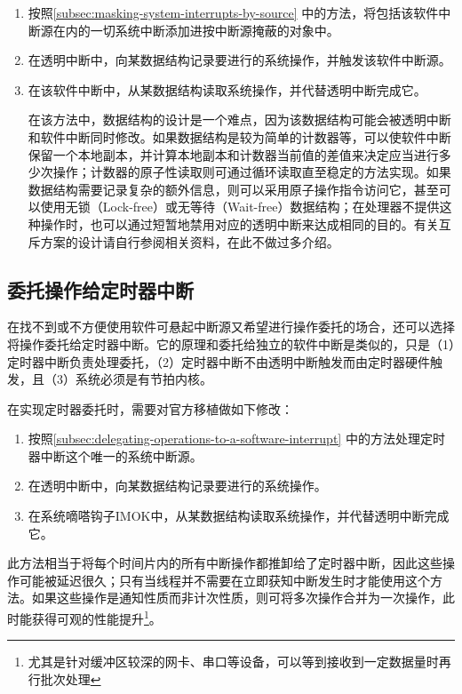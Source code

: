\begin{enumerate}
\def\labelenumi{\arabic{enumi}.}
\item
  按照\ref{subsec:masking-system-interrupts-by-source}
  中的方法，将包括该软件中断源在内的一切系统中断添加进按中断源掩蔽的对象中。
\item
  在透明中断中，向某数据结构记录要进行的系统操作，并触发该软件中断源。
\item
  在该软件中断中，从某数据结构读取系统操作，并代替透明中断完成它。

  在该方法中，数据结构的设计是一个难点，因为该数据结构可能会被透明中断和软件中断同时修改。如果数据结构是较为简单的计数器等，可以使软件中断保留一个本地副本，并计算本地副本和计数器当前值的差值来决定应当进行多少次操作；计数器的原子性读取则可通过循环读取直至稳定的方法实现。如果数据结构需要记录复杂的额外信息，则可以采用原子操作指令访问它，甚至可以使用无锁（Lock-free）或无等待（Wait-free）数据结构；在处理器不提供这种操作时，也可以通过短暂地禁用对应的透明中断来达成相同的目的。有关互斥方案的设计请自行参阅相关资料，在此不做过多介绍。
\end{enumerate}

\subsection{委托操作给定时器中断}\label{subsec:delegating-operations-to-the-timer-interrupt}

在找不到或不方便使用软件可悬起中断源又希望进行操作委托的场合，还可以选择将操作委托给定时器中断。它的原理和委托给独立的软件中断是类似的，只是（1）定时器中断负责处理委托，（2）定时器中断不由透明中断触发而由定时器硬件触发，且（3）系统必须是有节拍内核。

在实现定时器委托时，需要对官方移植做如下修改：

\begin{enumerate}
\def\labelenumi{\arabic{enumi}.}
\item
  按照\ref{subsec:delegating-operations-to-a-software-interrupt}
  中的方法处理定时器中断这个唯一的系统中断源。
\item
  在透明中断中，向某数据结构记录要进行的系统操作。
\item
  在系统嘀嗒钩子IMOK中，从某数据结构读取系统操作，并代替透明中断完成它。
\end{enumerate}

此方法相当于将每个时间片内的所有中断操作都推卸给了定时器中断，因此这些操作可能被延迟很久；只有当线程并不需要在立即获知中断发生时才能使用这个方法。如果这些操作是通知性质而非计次性质，则可将多次操作合并为一次操作，此时能获得可观的性能提升\footnote{尤其是针对缓冲区较深的网卡、串口等设备，可以等到接收到一定数据量时再行批次处理}。

